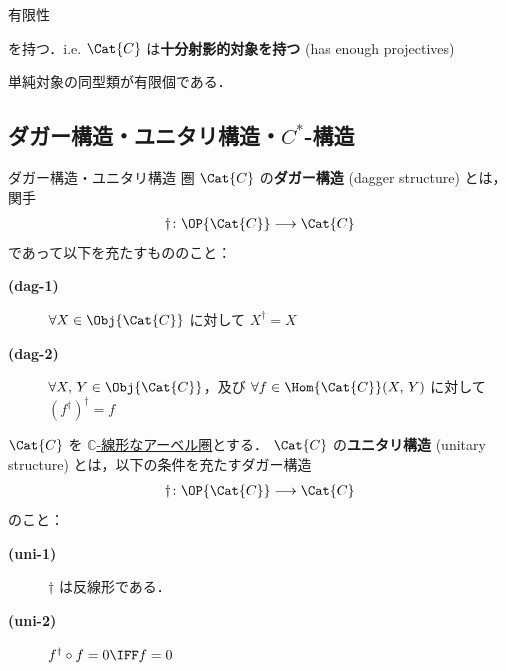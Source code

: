 \documentclass[TQFT_main]{subfiles}
\begin{document}
\begin{mydef}[label=def:finite-abcat]{有限性}
\begin{itemize}
\begin{description}
                を持つ．i.e. $\Cat{C}$ は\textbf{十分射影的対象を持つ} (has enough projectives)
                \item[\textbf{(Fin-4)}] 単純対象の同型類が有限個である．
            \end{description}
        \end{itemize}
    \end{mydef}

    \subsection{ダガー構造・ユニタリ構造・$C^*$-構造}

    \begin{mydef}[label=redef:unitary]{ダガー構造・ユニタリ構造}
        圏 $\Cat{C}$ の\textbf{ダガー構造} (dagger structure) とは，関手
        \begin{align}
            \dagger \colon \OP{\Cat{C}} \lto \Cat{C}
        \end{align}
        であって以下を充たすもののこと：
        \begin{description}
            \item[\textbf{(dag-1)}] $\forall X \in \Obj{\Cat{C}}$ に対して $X^\dagger = X$
            \item[\textbf{(dag-2)}] $\forall X,\, Y \in \Obj{\Cat{C}}$，及び $\forall f \in \Hom{\Cat{C}}(X,\, Y)$ に対して $(f^\dagger)^\dagger = f$
        \end{description}
        
        \tcblower

        $\Cat{C}$ を \hyperref[def:additive-cat]{$\mathbb{C}$-線形なアーベル圏}とする．
        $\Cat{C}$ の\textbf{ユニタリ構造} (unitary structure) とは，以下の条件を充たすダガー構造
        \begin{align}
            \dagger \colon \OP{\Cat{C}} \lto \Cat{C}
        \end{align}
        のこと：
        \begin{description}
            \item[\textbf{(uni-1)}] $\dagger$ は反線形である．
            \item[\textbf{(uni-2)}] $f^\dagger \circ f = 0 \IFF f = 0$
        \end{description}
    
    \end{mydef}
    
\end{document}
